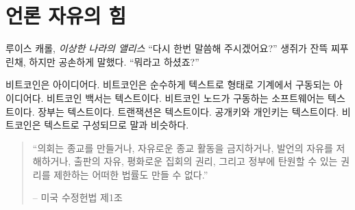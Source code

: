 \chapter{언론 자유의 힘}
\label{les:6}

\begin{chapquote}{루이스 캐롤, \textit{이상한 나라의 앨리스}}
	\enquote{다시 한번 말씀해 주시겠어요?} 생쥐가 잔뜩 찌푸린채, 하지만 공손하게 말했다. \enquote{뭐라고 하셨죠?}
\end{chapquote}

비트코인은 아이디어다. 비트코인은 순수하게 텍스트로 형태로 기계에서 구동되는 아이디어다.
비트코인 백서는 텍스트이다. 비트코인 노드가 구동하는 소프트웨어는 텍스트이다. 장부는 텍스트이다. 
트랜잭션은 텍스트이다. 
공개키와 개인키는 텍스트이다.
비트코인은 텍스트로 구성되므로 말과 비슷하다.
\begin{quotation}\begin{samepage}
		\enquote{의회는 종교를 만들거나, 자유로운 종교 활동을 금지하거나, 발언의 자유를 저해하거나, 
			출판의 자유, 평화로운 집회의 권리, 그리고 정부에 탄원할 수 있는 권리를 제한하는 어떠한 법률도 
			만들 수 없다.}
		\begin{flushright} -- 미국 수정헌법 제1조
\end{flushright}\end{samepage}\end{quotation}

